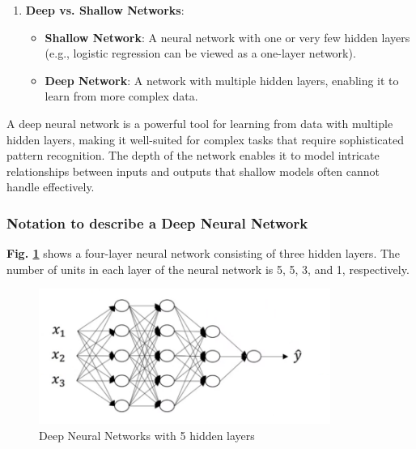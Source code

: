 \documentclass[letterpaper,12pt,notitlepage,twoside]{report}
\begin{document}
\begin{enumerate}
    \item \textbf{Deep vs. Shallow Networks}:
    \begin{itemize}
        \item \textbf{Shallow Network}: A neural network with one or very few hidden layers (e.g., logistic regression can be viewed as a one-layer network).
        \item \textbf{Deep Network}: A network with multiple hidden layers, enabling it to learn from more complex data.
    \end{itemize}
\end{enumerate}

\begin{example}
A deep neural network is a powerful tool for learning from data with multiple hidden layers, making it well-suited for complex tasks that require sophisticated pattern recognition. The depth of the network enables it to model intricate relationships between inputs and outputs that shallow models often cannot handle effectively.
\end{example}

\subsubsection{Notation to describe a Deep Neural Network}
\textbf{Fig. \ref{fig:16}} shows a four-layer neural network consisting of three hidden layers. The number of units in each layer of the neural network is 5, 5, 3, and 1, respectively.  
\begin{figure}[h]
	\centering
	\includegraphics[width=0.85\textwidth]{Images/Deep Neural Network.png}
	\caption{Deep Neural Networks with 5 hidden layers}
	\label{fig:16}
\end{figure}
\FloatBarrier
\end{document}
